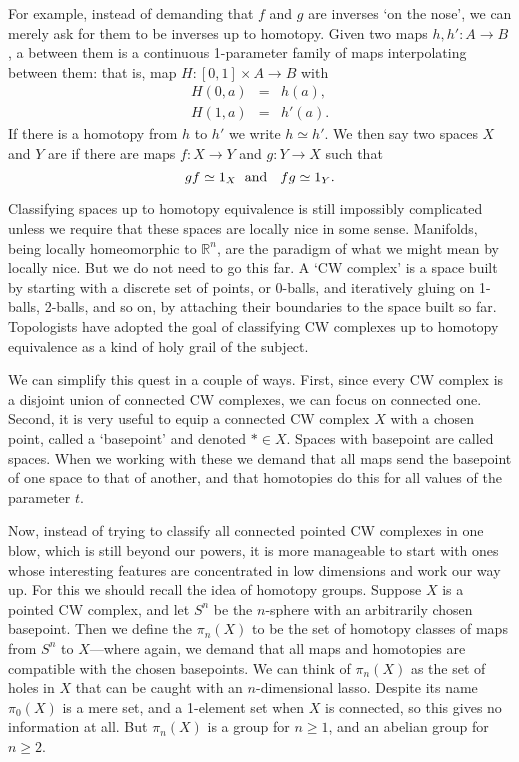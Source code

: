 \documentclass[reqno,12pt]{amsart}
\newcommand{\maps}{\colon}    %
\newcommand{\R}{{\mathbb R}}  %
\newcommand{\define}[1]{\textbf{\boldmath{#1}}}
\theoremstyle{definition}
\begin{document}
For example, instead of demanding that $f$ and $g$ are inverses `on the nose', we can merely ask for them to be inverses up to
homotopy.   Given two maps $h, h' \maps A \to B$, a \define{homotopy} between them is a continuous 1-parameter family of maps interpolating between them: that is, map $H \maps [0,1] \times A \to B$ with 
\[    \begin{array}{ccl}
H(0,a) &=& h(a),  \\
H(1,a) &=& h'(a) .
\end{array}
\]
If there is a homotopy from $h$ to $h'$ we write $h \simeq h'$.   We then say two spaces $X$ and $Y$ are \define{homotopy equivalent} if there are maps $f \maps X \to Y$ and $g \maps Y \to X$ such that 
\[        gf \simeq 1_X \textrm{\; and \; }  fg \simeq 1_Y. \]  

Classifying spaces up to homotopy equivalence is still impossibly complicated unless we require that these spaces are locally nice in some sense.  Manifolds, being locally homeomorphic to $\R^n$, are the paradigm of what we might mean by locally nice.  But we do not need to go this far.   A `CW complex' is a space built by starting with a discrete set of points, or 0-balls, and iteratively gluing on 1-balls, 2-balls, and so on, by attaching their boundaries to the space built so far.   Topologists have adopted the goal of classifying CW complexes up to homotopy equivalence as a kind of holy grail of the subject.

We can simplify this quest in a couple of ways.  First, since every CW complex is a disjoint union of connected CW complexes, we can focus on connected one.  Second, it is very useful to equip a connected CW complex $X$ with a chosen point, called a `basepoint' and denoted $\ast \in X$.  Spaces with basepoint are called \define{pointed} spaces.  When we working with these we demand that all maps send the basepoint of one space to that of another, and that homotopies do this for all values of the parameter $t$.

Now, instead of trying to classify all connected pointed CW complexes in one blow, which is still beyond our powers, it is more manageable to start with ones whose interesting features are concentrated in low dimensions and work our way up.   For this we should recall the idea of homotopy groups.   Suppose $X$ is a pointed CW complex, and let $S^n$ be the $n$-sphere with an arbitrarily chosen basepoint.  Then we define the \define{$n$th homotopy group} $\pi_n(X)$ to be the set of homotopy classes of maps from $S^n$ to $X$---where again, we demand that all maps and homotopies are compatible with the chosen basepoints.   We can think of $\pi_n(X)$ as the set of holes in $X$ that can be caught with an $n$-dimensional lasso.   Despite its name $\pi_0(X)$ is a mere set, and a 1-element set when $X$ is connected, so this gives no information at all.  But $\pi_n(X)$ is a group for $n \ge 1$, and an abelian group for $n \ge 2$.  
\end{document}

